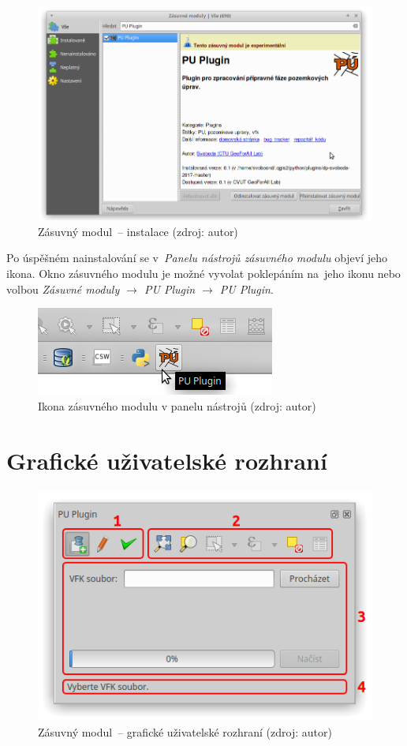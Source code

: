 	\begin{figure}[H] \centering
		\includegraphics[width=.8\textwidth]{./pictures/instalace-instalace_zasuvneho_modulu.png}
		\caption[Zásuvný modul~– instalace]{Zásuvný modul~–
instalace (zdroj: autor)}
		\label{fig:manual_instalace_puplugin}
 	\end{figure}

Po úspěšném nainstalování se v~\textit{Panelu nástrojů zásuvného
modulu} objeví jeho ikona. Okno zásuvného modulu je možné vyvolat
poklepáním na~jeho ikonu nebo volbou \textit{Zásuvné moduly
$\rightarrow$ PU Plugin $\rightarrow$ PU Plugin}.

	\begin{figure}[H] \centering
		\includegraphics[width=.4\textwidth]{./pictures/instalace-toolbar.png}
		\caption[Ikona zásuvného modulu v panelu
nástrojů]{Ikona zásuvného modulu v panelu nástrojů (zdroj: autor)}
		\label{fig:manual_ikona_v_panelu_nastroju}
 	\end{figure}

\section{Grafické uživatelské rozhraní}
\label{manual_gui}

	\begin{figure}[H] \centering
		\includegraphics[width=.55\textwidth]{./pictures/main_gui.png}
		\caption[Zásuvný modul~– grafické uživatelské
rozhraní]{Zásuvný modul~– grafické uživatelské rozhraní (zdroj:
autor)}
		\label{fig:manual_main_gui}
 	\end{figure}

